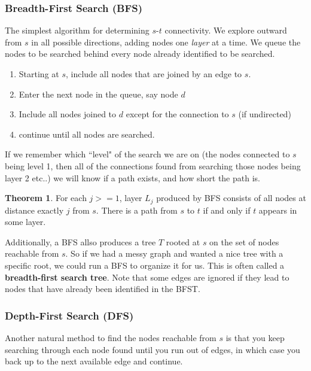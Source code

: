 \documentclass{report}
\theoremstyle{definition}
\newtheorem*{theo}{Theorem}
\begin{document}
			\subsubsection{Breadth-First Search (BFS)}
				The simplest algorithm for determining $s$-$t$ connectivity. We explore outward from $s$ in all
				possible directions, adding nodes one \textit{layer} at a time. We queue the nodes to be searched
				behind every node already identified to be searched.
				\begin{enumerate}
					\item Starting at $s$, include all nodes that are joined by an edge to $s$.
					\item Enter the next node in the queue, say node $d$
					\item Include all nodes joined to $d$ except for the connection to $s$ (if undirected)
					\item continue until all nodes are searched.
				\end{enumerate}
				If we remember which ``level" of the search we are on (the nodes connected to $s$ being level 1, then all 
				of the connections found from searching those nodes being layer 2 etc..) we will know if a path exists, and how 
				short the path is.
				\begin{theo}
					For each $j >= 1$, layer $L_j$ produced by BFS consists of all nodes at distance exactly $j$ from $s$. 
					There is a path from $s$ to $t$ if and only if $t$ appears in some layer.
				\end{theo}
				Additionally, a BFS allso produces a tree $T$ rooted at $s$ on the set of nodes reachable from $s$. So if we
				had a messy graph and wanted a nice tree with a specific root, we could run a BFS to organize it for us. This is
				often called a \textbf{breadth-first search tree}. Note that some edges are ignored if they lead to nodes that 
				have already been identified in the BFST.
			\subsubsection{Depth-First Search (DFS)}
				Another natural method to find the nodes reachable from $s$ is that you keep searching through each node
				found until you run out of edges, in which case you back up to the next available edge and continue.\\
\end{document}
